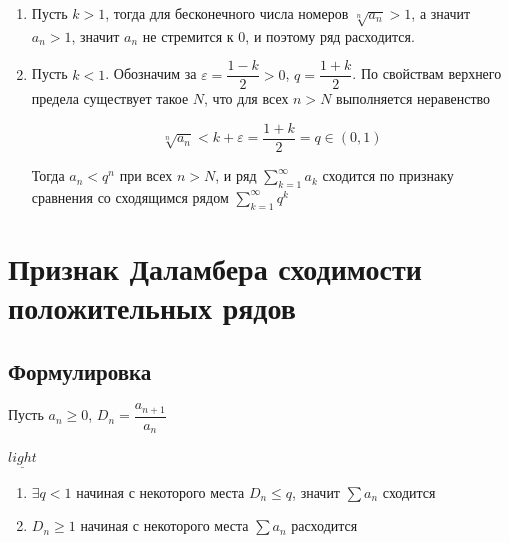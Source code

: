 \documentclass{article}
\begin{document}
            \begin{enumerate}
            
                \item Пусть $k > 1$, тогда для бесконечного числа номеров $\sqrt[n]{a_n} > 1$, а значит $a_n > 1$, значит $a_n$ не стремится к $0$, и поэтому ряд расходится.
                
                \item Пусть $k < 1$. Обозначим за $\varepsilon = \dfrac{1 - k}{2} > 0$, $q = \dfrac{1 + k}{2}$. По свойствам верхнего предела существует такое $N$, что для всех $n > N$ выполняется неравенство 
                
                    $$\sqrt[n]{a_n} < k + \varepsilon = \dfrac{1 + k}{2} = q \in (0, 1)$$
                    
                    Тогда $a_n < q^n$ при всех $n > N$, и ряд $\sum\limits^{\infty}_{k = 1} a_k$ сходится по признаку сравнения со сходящимся рядом $\sum\limits^{\infty}_{k = 1} q^k$
                
            \end{enumerate}
            
    \newpage
    
    \section{Признак Даламбера сходимости положительных рядов}
    
        \subsection{Формулировка}
        
            Пусть $a_n \geq 0$, $D_n = \dfrac{a_{n + 1}}{a_n}$
            
            $\underline{light}$
            
            \begin{enumerate}
            
                \item $\exists q < 1$ начиная с некоторого места $D_n \leq q$, значит $\sum a_n$ сходится
                
                \item $D_n \geq 1$ начиная с некоторого места $\sum a_n$ расходится
                
            \end{enumerate}
            
\end{document}
